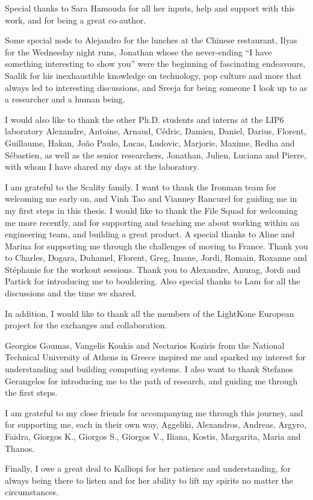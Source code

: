 Special thanks to Sara Hamouda for all her inputs, help and support with this work, and for being a great co-author.

Some special nods to
Alejandro for the lunches at the Chinese restaurant,
Ilyas for the Wednesday night runs,
Jonathan whose the never-ending ``I have something interesting to show you'' were the beginning of fascinating endeavours,
Saalik for his inexhaustible knowledge on technology, pop culture and more that always led to interesting discussions,
and Sreeja for being someone I look up to as a researcher and a human being.

I would also like to thank the other Ph.D. students and interns at the LIP6 laboratory
Alexandre, Antoine, Arnaud, C\'edric, Damien, Daniel, Darius, Florent, Guillaume, Hakan, Jo\~ao Paulo, Lucas, Ludovic, Marjorie, Maxime, Redha and S\'ebastien,
as well as the senior researchers, Jonathan, Julien, Luciana and Pierre, with whom I have shared my days at the laboratory.

I am grateful to the Scality family. I want to thank the Ironman team for welcoming me early on, and Vinh Tao and
Vianney Rancurel for guiding me in my first steps in this thesis.
I would like to thank the File Squad for welcoming me more recently, and for supporting and teaching me about working within
an engineering team, and building a great product.
A special thanks to Aline and Marina for supporting me through the challenges of moving to France.
Thank you to Charles, Dogara, Duhamel, Florent, Greg, Imane, Jordi, Romain, Roxanne and St\'ephanie for the workout
sessions.
Thank you to Alexandre, Anurag, Jordi and Partick for introducing me to bouldering.
Also special thanks to Lam for all the discussions and the time we shared.

In addition, I would like to thank all the members of the LightKone European project for the exchanges and collaboration.

\bigskip
Georgios Goumas, Vangelis Koukis and Nectarios Koziris from the National Technical University of Athens in Greece inspired
me and sparked my interest for understanding and building computing systems.
I also want to thank Stefanos Gerangelos for introducing me to the path of research, and guiding me through the first steps.

\bigskip
I am grateful to my close friends for accompanying me through this journey, and for supporting me,
each in their own way,
Aggeliki, Alexandros, Andreas, Argyro, Faidra, Giorgos K., Giorgos S., Giorgos V., Iliana, Kostis, Margarita, Maria and Thanos.

Finally, I owe a great deal to Kalliopi for her patience and understanding, for always being there to listen and for
her ability to lift my spirits no matter the circumstances.

\thispagestyle{empty}